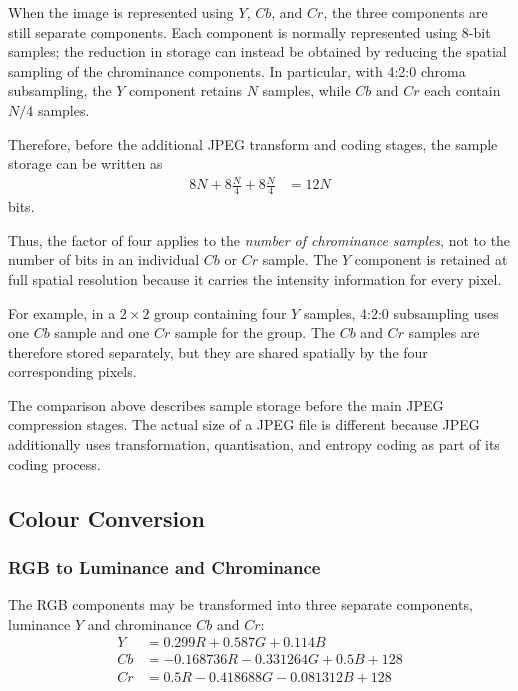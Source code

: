 When the image is represented using $Y$, $Cb$, and $Cr$, the three
components are still separate components. Each component is normally
represented using 8-bit samples; the reduction in storage can instead be
obtained by reducing the spatial sampling of the chrominance components.
In particular, with 4:2:0 chroma subsampling, the $Y$ component retains
$N$ samples, while $Cb$ and $Cr$ each contain $N/4$ samples.

Therefore, before the additional JPEG transform and coding stages, the
sample storage can be written as
\begin{align}
8N+8\frac{N}{4}+8\frac{N}{4}
&=12N\label{eq:app_ycbcr_420_storage_bits}
\end{align}
bits.

Thus, the factor of four applies to the \emph{number of chrominance
samples}, not to the number of bits in an individual $Cb$ or $Cr$ sample.
The $Y$ component is retained at full spatial resolution because it carries
the intensity information for every pixel.

For example, in a $2\times2$ group containing four $Y$ samples, 4:2:0
subsampling uses one $Cb$ sample and one $Cr$ sample for the group. The
$Cb$ and $Cr$ samples are therefore stored separately, but they are
shared spatially by the four corresponding pixels.

The comparison above describes sample storage before the main JPEG
compression stages. The actual size of a JPEG file is different because
JPEG additionally uses transformation, quantisation, and entropy coding
as part of its coding process.

\subsection{Colour Conversion}

\subsubsection{RGB to Luminance and Chrominance}

The RGB components may be transformed into three separate components,
luminance $Y$ and chrominance $Cb$ and $Cr$:
\begin{align}
Y  &= 0.299R + 0.587G + 0.114B\label{eq:app_y_luminance}\\
Cb &= -0.168736R - 0.331264G + 0.5B + 128\label{eq:app_cb_chrominance}\\
Cr &= 0.5R - 0.418688G - 0.081312B + 128\label{eq:app_cr_chrominance}
\end{align}

